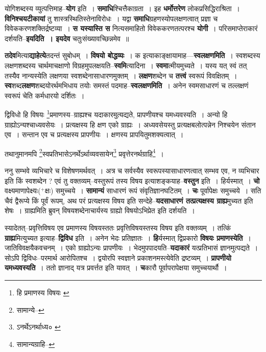 \documentclass[article,12pt,a4paper]{memoir}
\newcommand{\add}[1]{($^{+}$#1)}
\begin{document}
	  \pstart योगिशब्दस्य व्युत्पत्तिमाह--\textbf{योग} इति । \textbf{समाधि}श्चित्तैकाग्रता । इह \textbf{धर्मोत्तरेण} लोकप्रसिद्धिराश्रिता । \textbf{विनिश्चयटीकायां} तु शास्त्रस्थितिस्तेनाविरोधः । यद्वा \textbf{समाधि}ग्रहणस्योपलक्षणत्वात् प्रज्ञा च विवेककरणशक्तिर्द्रष्टव्या । \textbf{स यस्यास्ति स} नित्यसमाहितो विवेककरणतत्परश्च \textbf{योगी} । परिसमाप्तेराकारं दर्शयति--\textbf{इयदिति । इयदेव} चतुःसंख्यावच्छिन्नमेव ॥
	\pend
      

	  \pstart \textbf{तदेव}मित्या\textbf{द्याहेत्ये}तदन्तं सुबोधम् । \textbf{विषयो बोद्धव्यः} । क इत्याकाङ्क्षायामाह—\textbf{स्वलक्षणमिति} । स्वशब्दस्य लक्षणशब्दस्य चार्थमाचक्षाणो विग्रहमुपलक्षयति--\textbf{स्वमि}त्यादिना । \textbf{स्वमा}त्मीयमुच्यते । यस्य यत् स्वं तत् तस्यैव नान्यस्येति लक्षणया स्वशब्देनासाधारणमुक्तम् । \textbf{लक्षण}शब्देन च \textbf{तत्त्वं} स्वरूपं विवक्षितम् । \textbf{स्व}शब्द\textbf{लक्षण}शब्दयोरर्थमभिधाय तयोः समस्तं पदमाह--\textbf{स्वलक्षणमिति} । अनेन स्वमसाधारणं च तल्लक्षणं स्वरूपं चेति कर्मधारयो दर्शितः ।
	\pend
	  \bigskip
	  \begingroup
	

	  \pstart द्विविधो हि विषयः \footnote{हि प्रमाणस्य विषयः \cite{dp-msA} \cite{dp-edP} \cite{dp-edH} \cite{dp-edN}}\-प्रमाणस्य--ग्राह्यश्च यदाकारमुत्यद्यते, प्रापणीयश्च यमध्यवस्यति । अन्यो हि ग्राह्योऽन्यश्चाध्यवसेयः । प्रत्यक्षस्य हि क्षण एको ग्राह्यः । अध्यवसेयस्तु प्रत्यक्षबलोत्पन्नेन निश्चयेन संतान एव । सन्तान एव च प्रत्यक्षस्य प्रापणीयः । क्षणस्य प्रापयितुमशक्यत्वात् ।
	\pend
       

	  \pstart तथानुमानमपि \footnote{सामान्ये--\cite{dp-msD-n}}\-स्वप्रतिभासेऽनर्थेऽर्थाव्यवसायेन\footnote{ऽनर्थेऽनर्थाध्य० \cite{dp-msA} \cite{dp-edP} \cite{dp-edH}} प्रवृत्तेरनर्थग्राहि\footnote{सामान्यग्राहि--\cite{dp-msD-n}} ।
	\pend
      
	  \endgroup
	

	  \pstart ननु सम्भवे व्यभिचारे च विशेषणमर्थवत् । अत्र च सर्वस्यैव स्वरूपस्यासाधारणत्वात् सम्भव एव, न व्यभिचार इति किं स्वशब्देन ? एवं तु वक्तव्यम्--वस्तुरूपं तस्य विषय इत्याशङ्कयाह--\textbf{वस्तुन} इति । हिर्यस्मात् । \textbf{चो} वक्ष्यमाणापेक्ष्यः\add{क्षः} समुच्चये । \textbf{सामान्यं} साधारणं रूपं संवृतिज्ञानघटितम् । \textbf{चः} पूर्वापेक्षः समुच्चये । सति चैवं द्वैरूप्ये किं पूर्वं रूपम्, अथ परं प्रत्यक्षस्य विषय इति सन्देहे--\textbf{यदसाधारणं तत्प्रत्यक्षस्य ग्राह्य}मुच्यत इति शेषः । ग्राह्यमिति ब्रुवन् विषयशब्देनाचार्यस्य ग्राह्यो विषयोऽभिप्रेत इति दर्शयति ।
	\pend
      

	  \pstart स्यादेतत्--प्रवृत्तिविषय एव प्रमाणस्य विषयस्ततः प्रवृत्तिविषयस्तस्य विषय इति वक्तव्यम् । तत्किं \textbf{ग्राह्य}मित्युच्यत इत्याह--\textbf{द्विविध} इति । अनेन भेदः प्रतिज्ञातः । \textbf{हि}र्यस्मात् द्विप्रकारो \textbf{विषयः प्रमाणस्येति} । जातिविवक्षयैकवचनम् । एको ग्राह्योऽन्यः प्रापणीयः । भेदमुपपादयति--\textbf{यदाकारं} यत्प्रतिभासं ज्ञानमुत्पद्यते । सोऽपि द्विविधः--परमार्थ आरोपितश्च । द्वयोरपि स्वज्ञाने प्रकाशनमस्त्येवेति द्रष्टव्यम् । \textbf{प्रापणीयो यमध्यवस्यति} । ततो ज्ञानाद् यत्र प्रवर्त्तत इति यावत् । \textbf{च}कारौ पूर्वापरापेक्षया समुच्चयार्थौ ।
	\pend
      
\end{document}
